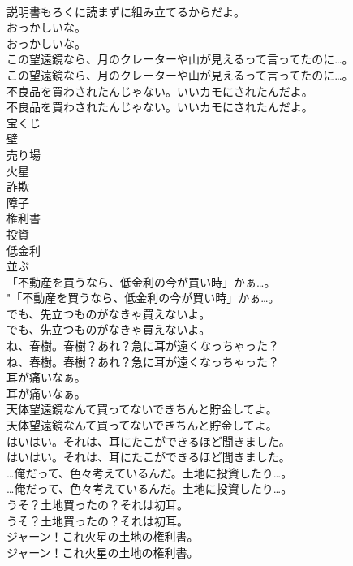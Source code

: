 \documentclass[8pt]{extreport}
\begin{document}
\begin{CJK}{UTF8}{min}
\\	説明書もろくに読まずに組み立てるからだよ。 
\\	おっかしいな。	
\\	おっかしいな。 
\\	この望遠鏡なら、月のクレーターや山が見えるって言ってたのに…。	
\\	この望遠鏡なら、月のクレーターや山が見えるって言ってたのに…。 
\\	不良品を買わされたんじゃない。いいカモにされたんだよ。	
\\	不良品を買わされたんじゃない。いいカモにされたんだよ。 
\\	宝くじ
\\	壁
\\	売り場
\\	火星
\\	詐欺
\\	障子
\\	権利書
\\	投資
\\	低金利
\\	並ぶ
\\	「不動産を買うなら、低金利の今が買い時」かぁ…。	
\\	"「不動産を買うなら、低金利の今が買い時」かぁ…。 
\\	でも、先立つものがなきゃ買えないよ。	
\\	でも、先立つものがなきゃ買えないよ。 
\\	ね、春樹。春樹？あれ？急に耳が遠くなっちゃった？	
\\	ね、春樹。春樹？あれ？急に耳が遠くなっちゃった？ 
\\	耳が痛いなぁ。	
\\	耳が痛いなぁ。 
\\	天体望遠鏡なんて買ってないできちんと貯金してよ。	
\\	天体望遠鏡なんて買ってないできちんと貯金してよ。 
\\	はいはい。それは、耳にたこができるほど聞きました。	
\\	はいはい。それは、耳にたこができるほど聞きました。 
\\	…俺だって、色々考えているんだ。土地に投資したり…。	
\\	…俺だって、色々考えているんだ。土地に投資したり…。 
\\	うそ？土地買ったの？それは初耳。	
\\	うそ？土地買ったの？それは初耳。 
\\	ジャーン！これ火星の土地の権利書。	
\\	ジャーン！これ火星の土地の権利書。 

\end{CJK}
\end{document}
